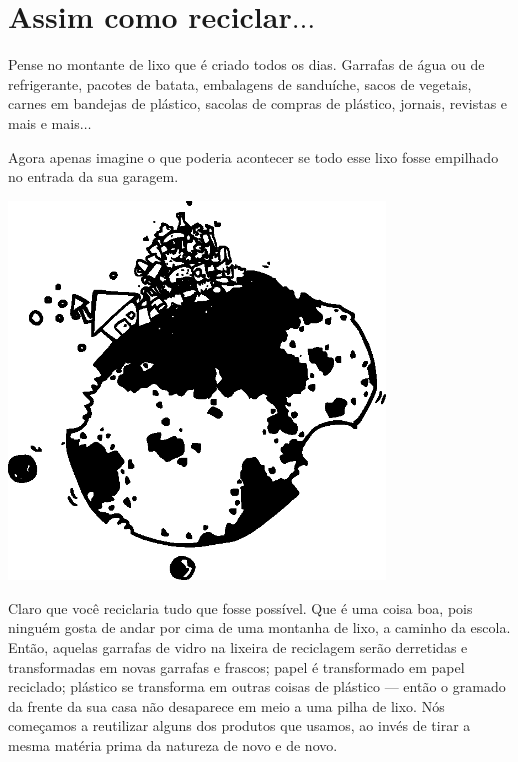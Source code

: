 

\chapter{Assim como reciclar$\ldots$}\label{ch:sortoflikerecycling}

Pense no montante de lixo que é criado todos os dias. Garrafas de água ou de refrigerante, pacotes de batata, embalagens de sanduíche, sacos de vegetais, carnes em bandejas de plástico, sacolas de compras de plástico, jornais, revistas e mais e mais$\ldots$
\par
Agora apenas imagine o que poderia acontecer se todo esse lixo fosse empilhado no entrada da sua garagem.

\begin{center}
\includegraphics*[width=100mm]{eps/trash.eps}
\end{center}

Claro que você reciclaria tudo que fosse possível. Que é uma coisa boa, pois ninguém gosta de andar por cima de uma montanha de lixo, a caminho da escola. Então, aquelas garrafas de vidro na lixeira de reciclagem serão derretidas e transformadas em novas garrafas e frascos; papel é transformado em papel reciclado; plástico se transforma em outras coisas de plástico --- então o gramado da frente da sua casa não desaparece em meio a uma pilha de lixo. Nós começamos a reutilizar alguns dos produtos que usamos, ao invés de tirar a mesma matéria prima da natureza de novo e de novo.

